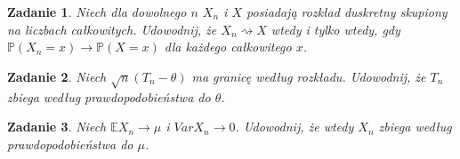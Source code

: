 \documentclass{mwart}
\newtheorem{zd}{Zadanie}
\begin{document}
\begin{zd}
Niech dla dowolnego $n$ $X_n$ i $X$ posiadają rozkład duskretny skupiony na liczbach całkowitych. Udowodnij, że $X_n \rightsquigarrow X$ wtedy i tylko wtedy, gdy $\mathbb{P}(X_n=x) \to \mathbb{P}(X=x)$ dla każdego całkowitego $x$.
\end{zd}

\begin{zd}
Niech $\sqrt{n}(T_n-\theta)$ ma granicę według rozkładu. Udowodnij, że $T_n$ zbiega według prawdopodobieństwa do $\theta$.
\end{zd}

\begin{zd}
Niech $\mathbb{E}X_n \to \mu$ i $VarX_n \to 0$. Udowodnij, że wtedy $X_n$ zbiega według prawdopodobieństwa do $\mu$.
\end{zd}
\end{document}
